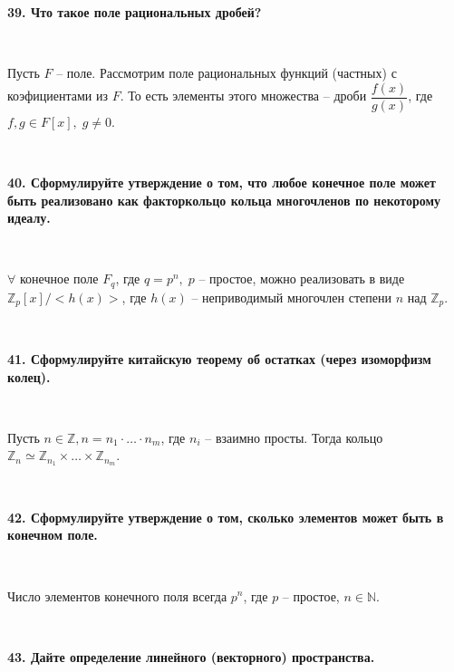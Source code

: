 \documentclass{article}
\begin{document}
	\textbf{39. Что такое поле рациональных дробей?}
	
	{
		$\;$
		\setlength{\parindent}{0.4cm}
		\hangindent=0.4cm
		
		Пусть $F$ -- поле. Рассмотрим поле рациональных функций (частных) с коэфициентами из $F$. То есть элементы этого множества -- дроби $\dfrac{f(x)}{g(x)}$, где $f, g\in F[x], \;g\ne 0$.
		
		$\;$
		\setlength{\parindent}{0cm}
		\hangindent=0cm
	}
	
	\newpage
	
	\textbf{40. Сформулируйте утверждение о том, что любое конечное поле может быть реализовано как факторкольцо кольца многочленов по некоторому идеалу.}
	
	{
		$\;$
		\setlength{\parindent}{0.4cm}
		\hangindent=0.4cm
		
		$\forall$ конечное поле $F_q$, где $q=p^n, \;p$ -- простое, можно реализовать в виде $\mathbb{Z}_p[x]/<h(x)>$, где $h(x)$ -- неприводимый многочлен степени $n$ над $\mathbb{Z}_p$.
		
		$\;$
		\setlength{\parindent}{0cm}
		\hangindent=0cm
	}
	
	\textbf{41. Сформулируйте китайскую теорему об остатках (через изоморфизм колец).}
	
	{
		$\;$
		\setlength{\parindent}{0.4cm}
		\hangindent=0.4cm
		
		Пусть $n\in\mathbb{Z}, n=n_1\cdot\ldots\cdot n_m$, где $n_i$ -- взаимно просты. Тогда кольцо $\mathbb{Z}_n\simeq\mathbb{Z}_{n_1}\times\ldots\times\mathbb{Z}_{n_m}$.
		
		$\;$
		\setlength{\parindent}{0cm}
		\hangindent=0cm
	}
	
	\textbf{42. Сформулируйте утверждение о том, сколько элементов может быть в конечном поле.}
	
		{
		$\;$
		\setlength{\parindent}{0.4cm}
		\hangindent=0.4cm
		
		Число элементов конечного поля всегда $p^n$, где $p$ -- простое, $n\in\mathbb{N}$.
		
		$\;$
		\setlength{\parindent}{0cm}
		\hangindent=0cm
	}
	
	\textbf{43. Дайте определение линейного (векторного) пространства.}
	
\end{document}
